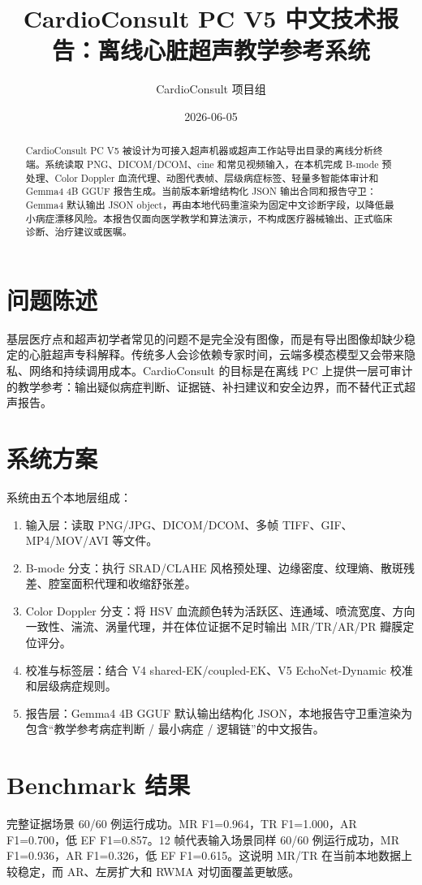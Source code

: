 \documentclass[UTF8,fontset=windows,zihao=-4]{ctexart}
\title{CardioConsult PC V5 中文技术报告：离线心脏超声教学参考系统}
\author{CardioConsult 项目组}
\date{2026-06-05}
\begin{document}
\maketitle

\begin{abstract}
CardioConsult PC V5 被设计为可接入超声机器或超声工作站导出目录的离线分析终端。系统读取 PNG、DICOM/DCOM、cine 和常见视频输入，在本机完成 B-mode 预处理、Color Doppler 血流代理、动图代表帧、层级病症标签、轻量多智能体审计和 Gemma4 4B GGUF 报告生成。当前版本新增结构化 JSON 输出合同和报告守卫：Gemma4 默认输出 JSON object，再由本地代码重渲染为固定中文诊断字段，以降低最小病症漂移风险。本报告仅面向医学教学和算法演示，不构成医疗器械输出、正式临床诊断、治疗建议或医嘱。
\end{abstract}

\section{问题陈述}
基层医疗点和超声初学者常见的问题不是完全没有图像，而是有导出图像却缺少稳定的心脏超声专科解释。传统多人会诊依赖专家时间，云端多模态模型又会带来隐私、网络和持续调用成本。CardioConsult 的目标是在离线 PC 上提供一层可审计的教学参考：输出疑似病症判断、证据链、补扫建议和安全边界，而不替代正式超声报告。

\section{系统方案}
系统由五个本地层组成：
\begin{enumerate}
  \item 输入层：读取 PNG/JPG、DICOM/DCOM、多帧 TIFF、GIF、MP4/MOV/AVI 等文件。
  \item B-mode 分支：执行 SRAD/CLAHE 风格预处理、边缘密度、纹理熵、散斑残差、腔室面积代理和收缩舒张差。
  \item Color Doppler 分支：将 HSV 血流颜色转为活跃区、连通域、喷流宽度、方向一致性、湍流、涡量代理，并在体位证据不足时输出 MR/TR/AR/PR 瓣膜定位评分。
  \item 校准与标签层：结合 V4 shared-EK/coupled-EK、V5 EchoNet-Dynamic 校准和层级病症规则。
  \item 报告层：Gemma4 4B GGUF 默认输出结构化 JSON，本地报告守卫重渲染为包含“教学参考病症判断 / 最小病症 / 逻辑链”的中文报告。
\end{enumerate}

\section{Benchmark 结果}
完整证据场景 60/60 例运行成功。MR F1=0.964，TR F1=1.000，AR F1=0.700，低 EF F1=0.857。12 帧代表输入场景同样 60/60 例运行成功，MR F1=0.936，AR F1=0.326，低 EF F1=0.615。这说明 MR/TR 在当前本地数据上较稳定，而 AR、左房扩大和 RWMA 对切面覆盖更敏感。
\end{document}
